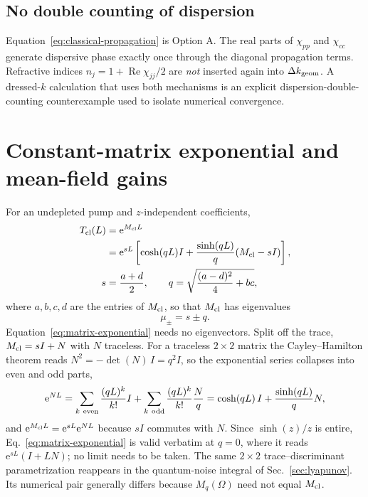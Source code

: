 \documentclass[11pt,a4paper]{article}
\newcommand{\e}{\mathrm e}
\newcommand{\Rea}{\operatorname{Re}}
\begin{document}
\subsection*{No double counting of dispersion}

Equation~\eqref{eq:classical-propagation} is Option A. The real parts of
$\chi_{pp}$ and $\chi_{cc}$ generate dispersive phase exactly once through the
diagonal propagation terms. Refractive indices
$n_j=1+\Rea\chi_{jj}/2$ are \emph{not} inserted again into
$\Delta k_{\rm geom}$. A dressed-$k$ calculation that uses both mechanisms is
an explicit dispersion-double-counting counterexample used to isolate numerical convergence.

\section{Constant-matrix exponential and mean-field gains}
\label{sec:matrix-exponential}

For an undepleted pump and $z$-independent coefficients,
\begin{align}
T_{\rm cl}(L)&=\e^{M_{\rm cl}L}\nonumber\\
&=\e^{sL}\left[
\cosh(qL)I+\frac{\sinh(qL)}q(M_{\rm cl}-sI)\right],\\
s&=\frac{a+d}{2},\qquad
q=\sqrt{\frac{(a-d)^2}{4}+bc},
\label{eq:matrix-exponential}
\end{align}
where $a,b,c,d$ are the entries of $M_{\rm cl}$, so that $M_{\rm cl}$ has
eigenvalues
\begin{equation}
\mu_\pm=s\pm q .
\label{eq:Mcl-eigenvalues}
\end{equation}
Equation~\eqref{eq:matrix-exponential} needs no eigenvectors. Split off the
trace,
$M_{\rm cl}=sI+N$ with $N$ traceless. For a traceless $2\times2$ matrix the
Cayley--Hamilton theorem reads $N^2=-\det(N)\,I=q^2I$, so the exponential
series collapses into even and odd parts,
\begin{equation}
\e^{NL}=\sum_{k\ \rm even}\frac{(qL)^k}{k!}I
+\sum_{k\ \rm odd}\frac{(qL)^{k}}{k!}\frac{N}{q}
=\cosh(qL)\,I+\frac{\sinh(qL)}{q}N ,
\label{eq:cayley-hamilton}
\end{equation}
and $\e^{M_{\rm cl}L}=\e^{sL}\e^{NL}$ because $sI$ commutes with $N$. Since
$\sinh(z)/z$ is entire, Eq.~\eqref{eq:matrix-exponential} is valid verbatim
at $q=0$, where it reads $\e^{sL}(I+LN)$; no limit needs to be taken. The
same $2\times2$ trace--discriminant
parametrization reappears in the quantum-noise integral of
Sec.~\ref{sec:lyapunov}. Its numerical pair generally differs because
$M_q(\Omega)$ need not equal $M_{\rm cl}$.
\end{document}
